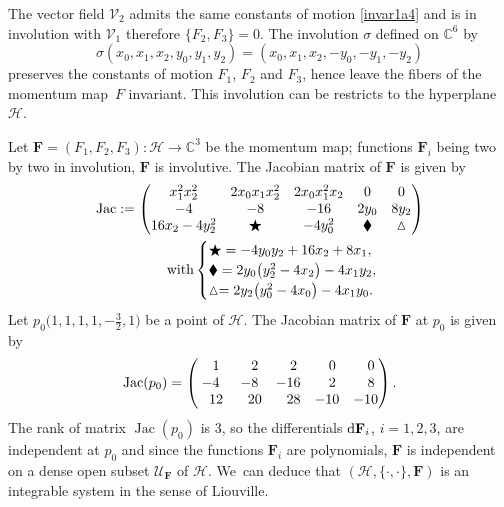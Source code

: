 \documentclass[pdftex]{sigma}
\numberwithin{equation}{section}
\begin{document}
The vector field $\mathcal{V}_2$ admits the same constants of
 motion \eqref{invar1a4} and is in involution with $\mathcal{V}_1$ therefore $\{F_2,F_3\}=0$. The involution $\sigma$ defined on $\mathbb{C}^6$ by
 \[\sigma(x_0,x_1,x_2,y_0,y_1,y_2)=(x_0,x_1,x_2, -y_0,-y_1,-y_2)
 \]
 preserves the constants of motion $F_1$, $F_2$ and $F_3$, hence leave the fibers of the momentum map~$F$ invariant. This involution can be restricts to the hyperplane $\mathcal{H}$.

Let $\mathbf{F}=(F_1,F_2,F_3)\colon \mathcal{H} \rightarrow
\mathbb{C}^3$ be the momentum map; functions $\mathbf{F}_i$ being
two by two in involution, $\mathbf{F}$ is involutive. The Jacobian
matrix of $\mathbf{F}$ is given by
\begin{gather*}
\operatorname{Jac}:=\begin{pmatrix}
 x_1^2x_2^2 & 2x_0x_1x_2^2 & 2x_0x_1^2x_2 & 0& 0 \\
 -4 & -8 & -16 & 2y_0 & 8y_2 \\
 16x_2-4y_2^2 & \bigstar & -4y_0^2 & \blacklozenge &\vartriangle
 \end{pmatrix}\\
 \hphantom{\operatorname{Jac}:=}{}\text{with}
 \begin{cases}
 \bigstar=-4y_0y_2+16x_2+8x_1, \\
 \blacklozenge=2y_0\bigl(y_2^2-4x_2\bigr)-4x_1y_2, \\
 \vartriangle= 2y_2\bigl(y_0^2-4x_0\bigr)-4x_1y_0.
 \end{cases}
 \end{gather*}
 Let $p_0\bigl(1,1,1,1,-\frac{3}{2},1\bigr)$ be
a point of $\mathcal{H}$. The Jacobian matrix of $\mathbf{F}$ at
$p_0$ is given by
\[\operatorname{Jac}(p_0)=\begin{pmatrix}
 \hphantom{-}1 & \hphantom{-}2 & \hphantom{-}2 & \hphantom{-}0 & \hphantom{-}0 \\
 -4 & -8 & -16 & \hphantom{-}2 & \hphantom{-}8 \\
 \hphantom{-}12 & \hphantom{-}20 & \hphantom{-}28 & -10 & -10
 \end{pmatrix}.\]
The rank of matrix $\operatorname{Jac}(p_0)$ is $3$, so the
differentials ${\rm d}\mathbf{F}_i$, $i=1,2,3$, are
independent at $p_0$ and since the functions $\mathbf{F}_i$ are
polynomials, $\mathbf{F}$ is independent on a dense open subset
$\mathcal{U}_{\mathbf{F}}$ of $\mathcal{H}$.
We~can deduce that $(\mathcal{H},\{\cdot,\cdot\},\mathbf{F})$ is an integrable system in the sense of Liouville.
\end{document}
